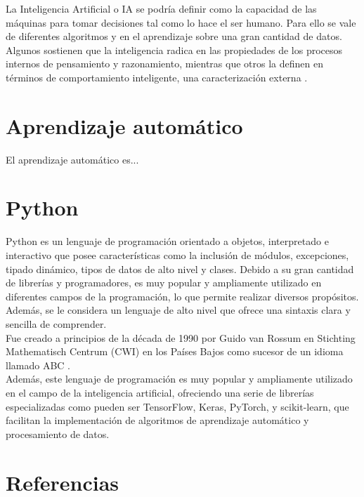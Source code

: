 La Inteligencia Artificial o IA se podría definir como la capacidad de las máquinas para tomar decisiones tal como lo hace el ser humano. Para ello se vale de diferentes algoritmos y en el aprendizaje sobre una gran cantidad de datos. Algunos sostienen que la inteligencia radica en las propiedades de los procesos internos de pensamiento y razonamiento, mientras que otros la definen en términos de comportamiento inteligente, una caracterización externa \cite{aimodaproach}.

\section{Aprendizaje automático}
El aprendizaje automático es...

\section{Python}

Python \cite{python} es un lenguaje de programación orientado a objetos, interpretado e interactivo que posee características como la inclusión de módulos, excepciones, tipado dinámico, tipos de datos de alto nivel y clases. Debido a su gran cantidad de librerías y programadores, es muy popular y ampliamente utilizado en diferentes campos de la programación, lo que permite realizar diversos propósitos. Además, se le considera un lenguaje de alto nivel que ofrece una sintaxis clara y sencilla de comprender. \\
Fue creado a principios de la década de 1990 por Guido van Rossum en Stichting Mathematisch Centrum (CWI) en los Países Bajos como sucesor de un idioma llamado ABC \cite{pythonhistory}. \\
Además, este lenguaje de programación es muy popular y ampliamente utilizado en el campo de la inteligencia artificial, ofreciendo una serie de librerías especializadas como pueden ser TensorFlow, Keras, PyTorch, y scikit-learn, que facilitan la implementación de algoritmos de aprendizaje automático y procesamiento de datos. \\
\section{Referencias}

